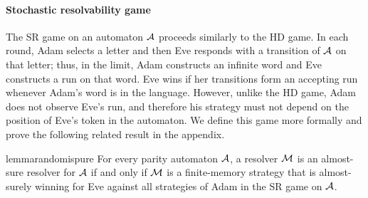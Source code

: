 \paragraph*{Stochastic resolvability game} The SR game on an automaton $\mathcal{A}$ proceeds similarly to the HD game. In each round, Adam selects a letter and then Eve responds with a transition of $\mathcal{A}$ on that letter; thus, in the limit, Adam constructs an infinite word and Eve constructs a run on that word. 
Eve wins if her transitions form an accepting run whenever Adam's word is in the language. However, unlike the HD game, Adam does not observe Eve's run, and therefore his strategy must not depend on the position of Eve's token in the automaton. We define this game more formally and prove the following related result in the appendix.

\begin{restatable}{lemma}{randomispure}\label{lemma:random-is-pure}
For every parity automaton $\mathcal{A}$, a resolver $\mathcal{M}$ is an almost-sure resolver for $\mathcal{A}$ if and only if $\mathcal{M}$ is a finite-memory strategy that is almost-surely winning for Eve against all strategies of Adam in the SR game on $\mathcal{A}$.
\end{restatable}


